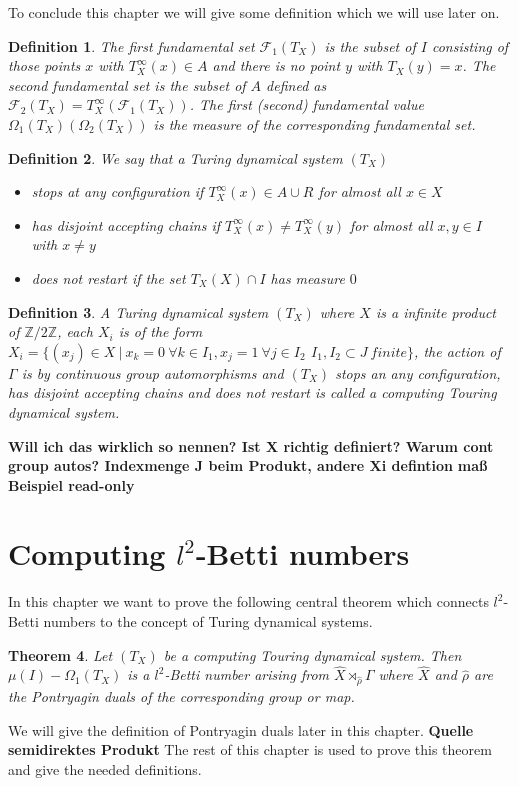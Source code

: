 \documentclass[12pt,a4paper]{scrartcl}
\newtheorem{Theorem}{Theorem}[section]
\newtheorem{Definition}[Theorem]{Definition}
\numberwithin{equation}{section}
\newcommand{\2}{\mathbb{Z} / 2 \mathbb{Z}}
\begin{document}
To conclude this chapter we will give some definition which we will use later on. 
\begin{Definition}
	The first fundamental set $\mathcal{F}_1(T_X)$ is the subset of $I$ consisting of those points $x$ with $T_X^\infty(x) \in A$ and there is no point $y$ with $T_X(y)=x$. The second fundamental set is the subset of $A$ defined as $\mathcal{F}_2(T_X)=T_X^\infty(\mathcal{F}_1(T_X))$. The first (second) fundamental value $\Omega_1(T_X) ( \Omega_2(T_X))$ is the measure of the corresponding fundamental set.
\end{Definition}

\begin{Definition}
	We say that a Turing dynamical system $(T_X)$
	\begin{itemize}
		\item stops at any configuration if $T_X^\infty (x) \in A \cup R$ for almost all $x \in X$
		\item has disjoint accepting chains if $T_X^\infty (x) \neq T_X^\infty (y)$ for almost all $x, y \in I$ with $x \neq y$
		\item does not restart if the set $T_X(X) \cap I$ has measure $0$
	\end{itemize}
\end{Definition}

\begin{Definition}
	A Turing dynamical system $(T_X)$ where $X$ is a infinite product of $\2$, each $X_i$ is of the form $X_i = \{(x_j) \in X \ | \ x_k = 0 \ \forall k \in I_1, x_j = 1 \ \forall j \in I_2\, \ I_1, I_2 \subset J \ finite\}$, the action of $\Gamma$ is by continuous group automorphisms and  $(T_X)$ stops an any configuration, has disjoint accepting chains and does not restart is called a computing Touring dynamical system.
\end{Definition}
\textbf{Will ich das wirklich so nennen? Ist X richtig definiert? Warum cont group autos? Indexmenge J beim Produkt, andere Xi defintion}
\textbf{maß}
\textbf{Beispiel read-only}



\section{Computing $l^2$-Betti numbers}
In this chapter we want to prove the following central theorem which connects $l^2$-Betti numbers to the concept of Turing dynamical systems.
\begin{Theorem}
	Let $(T_X)$ be a computing Touring dynamical system. Then $\mu (I) - \Omega_1(T_X)$ is a $l^2$-Betti number arising from $\hat{X} \rtimes_{\hat{\rho}} \Gamma$ where $\hat{X}$ and $\hat{\rho}$ are the Pontryagin duals of the corresponding group or map.
\end{Theorem}
We will give the definition of Pontryagin duals later in this chapter. \textbf{Quelle semidirektes Produkt} The rest of this chapter is used to prove this theorem and give the needed definitions.
\end{document}
